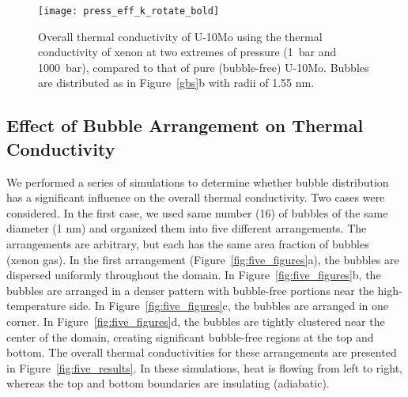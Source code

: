 
\begin{figure}
	\centering
	\texttt{[image: press\_eff\_k\_rotate\_bold]}
	\caption[Overall thermal conductivity of U-10Mo using the thermal 
        conductivity of xenon at two extremes of pressure
        (1~bar and 1000~bar)]{Overall thermal conductivity of U-10Mo using the thermal 
        conductivity of xenon at two extremes of pressure
        (1~bar and 1000~bar), compared to that of pure (bubble-free) U-10Mo. Bubbles are distributed as in Figure~\ref{gbs}b with radii of 1.55 nm.}
	\label{fig_press_K}
\end{figure}

\subsection{Effect of Bubble Arrangement on Thermal Conductivity}
\label{subsec:area}
We performed a series of simulations to determine whether bubble distribution has a significant influence on the overall thermal conductivity. Two cases were considered. In the first case, we used same number (16) of bubbles of the same diameter (1 nm) and organized them into five different arrangements. The arrangements are arbitrary, but each has the same area fraction of bubbles (xenon gas). In the first arrangement (Figure~\ref{fig:five_figures}a), the bubbles are dispersed uniformly throughout the domain. In Figure~\ref{fig:five_figures}b, the bubbles are arranged in a denser pattern with bubble-free portions near the high-temperature side. In Figure~\ref{fig:five_figures}c, the bubbles are arranged in one corner. In Figure~\ref{fig:five_figures}d, the bubbles are tightly clustered near the center of the domain, creating significant bubble-free regions at the top and bottom. The overall thermal conductivities for these arrangements are presented in Figure~\ref{fig:five_results}.
In these simulations, heat is flowing from left to right, whereas the top and bottom boundaries are insulating (adiabatic).


